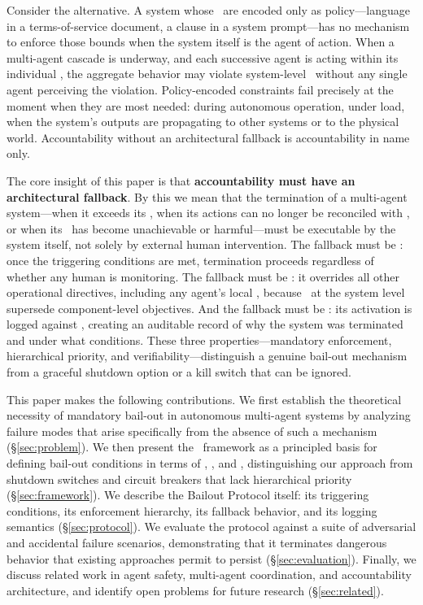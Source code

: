 Consider the alternative. A system whose \bounds\ are encoded only as policy—language in a terms-of-service document, a clause in a system prompt—has no mechanism to enforce those bounds when the system itself is the agent of action. When a multi-agent cascade is underway, and each successive agent is acting within its individual \purpose, the aggregate behavior may violate system-level \bounds\ without any single agent perceiving the violation. Policy-encoded constraints fail precisely at the moment when they are most needed: during autonomous operation, under load, when the system's outputs are propagating to other systems or to the physical world. Accountability without an architectural fallback is accountability in name only.

The core insight of this paper is that \textbf{accountability must have an architectural fallback}. By this we mean that the termination of a multi-agent system—when it exceeds its \bounds, when its actions can no longer be reconciled with \fact, or when its \purpose\ has become unachievable or harmful—must be executable by the system itself, not solely by external human intervention. The fallback must be \mandatory: once the triggering conditions are met, termination proceeds regardless of whether any human is monitoring. The fallback must be \hierarchical: it overrides all other operational directives, including any agent's local \purpose, because \bounds\ at the system level supersede component-level objectives. And the fallback must be \verifiable: its activation is logged against \fact, creating an auditable record of why the system was terminated and under what conditions. These three properties—mandatory enforcement, hierarchical priority, and verifiability—distinguish a genuine bail-out mechanism from a graceful shutdown option or a kill switch that can be ignored.

This paper makes the following contributions. We first establish the theoretical necessity of mandatory bail-out in autonomous multi-agent systems by analyzing failure modes that arise specifically from the absence of such a mechanism (\S\ref{sec:problem}). We then present the \bxthree\ framework as a principled basis for defining bail-out conditions in terms of \purpose, \bounds, and \fact, distinguishing our approach from shutdown switches and circuit breakers that lack hierarchical priority (\S\ref{sec:framework}). We describe the Bailout Protocol itself: its triggering conditions, its enforcement hierarchy, its fallback behavior, and its logging semantics (\S\ref{sec:protocol}). We evaluate the protocol against a suite of adversarial and accidental failure scenarios, demonstrating that it terminates dangerous behavior that existing approaches permit to persist (\S\ref{sec:evaluation}). Finally, we discuss related work in agent safety, multi-agent coordination, and accountability architecture, and identify open problems for future research (\S\ref{sec:related}).

